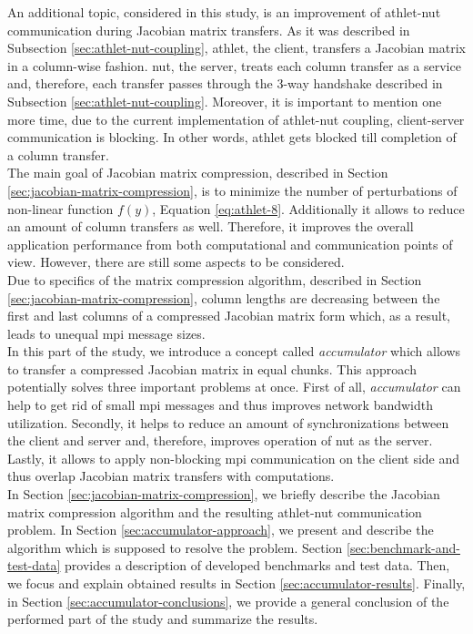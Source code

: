 An additional topic, considered in this study, is an improvement of \acrshort{athlet}-\acrshort{nut} communication during Jacobian matrix transfers. As it was described in Subsection \ref{sec:athlet-nut-coupling}, \acrshort{athlet}, the client, transfers a Jacobian matrix in a column-wise fashion. \acrshort{nut}, the server, treats each column transfer as a service and, therefore, each transfer passes through the 3-way handshake described in Subsection \ref{sec:athlet-nut-coupling}. Moreover, it is important to mention one more time,   due to the current implementation of \acrshort{athlet}-\acrshort{nut} coupling, client-server communication is blocking. In other words, \acrshort{athlet} gets blocked till completion of a column transfer. \\


The main goal of Jacobian matrix compression, described in Section \ref{sec:jacobian-matrix-compression}, is to minimize the number of perturbations of non-linear function $f(y)$, Equation \ref{eq:athlet-8}. Additionally it allows to reduce an amount of column transfers as well. Therefore, it improves the overall application performance from both computational and communication points of view. However, there are still some aspects to be considered.\\


Due to specifics of the matrix compression algorithm, described in Section \ref{sec:jacobian-matrix-compression}, column lengths are decreasing between the first and last columns of a compressed Jacobian matrix form which, as a result, leads to unequal \acrshort{mpi} message sizes.\\


In this part of the study, we introduce a concept called \textit{accumulator} which allows to transfer a compressed Jacobian matrix in equal chunks. This approach potentially solves three important problems at once. First of all, \textit{accumulator} can help to get rid of small \acrshort{mpi} messages and thus improves network bandwidth utilization. Secondly, it helps to reduce an amount of synchronizations between the client and server and, therefore, improves operation of \acrshort{nut} as the server. Lastly, it allows to apply non-blocking \acrshort{mpi} communication on the client side and thus overlap Jacobian matrix transfers with computations.\\


In Section \ref{sec:jacobian-matrix-compression}, we briefly describe the Jacobian matrix compression algorithm and the resulting \acrshort{athlet}-\acrshort{nut} communication problem. In Section \ref{sec:accumulator-approach}, we present and describe the algorithm which is supposed to resolve the problem. Section \ref{sec:benchmark-and-test-data} provides a description of developed benchmarks and test data. Then, we focus and explain obtained results in Section \ref{sec:accumulator-results}. Finally, in Section \ref{sec:accumulator-conclusions}, we provide a general conclusion of the performed part of the study and summarize the results.\\
